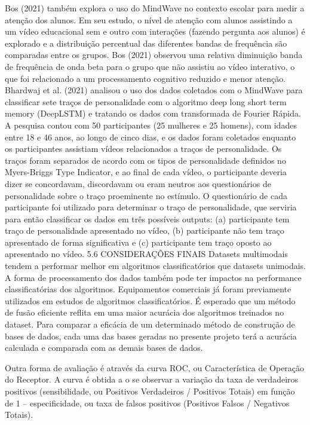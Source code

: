 Bos (2021) também explora o uso do MindWave no contexto escolar para medir a atenção dos alunos. Em seu estudo, o nível de atenção com alunos assistindo a um vídeo educacional sem e outro com interações (fazendo pergunta aos alunos) é explorado e a distribuição percentual das diferentes bandas de frequência são comparadas entre os grupos. Bos (2021) observou uma relativa diminuição banda de frequência de onda beta para o grupo que não assistiu ao vídeo interativo, o que foi relacionado a um processamento cognitivo reduzido e menor atenção.
Bhardwaj et al. (2021) analisou o uso dos dados coletados com o MindWave para classificar sete traços de personalidade com o algoritmo deep long short term memory (DeepLSTM) e tratando os dados com transformada de Fourier Rápida. A pesquisa contou com 50 participantes (25 mulheres e 25 homens), com idades entre 18 e 46 anos, ao longo de cinco dias, e os dados foram coletados enquanto os participantes assistiam vídeos relacionados a traços de personalidade. Os traços foram separados de acordo com os tipos de personalidade definidos no Myers-Briggs Type Indicator, e ao final de cada vídeo, o participante deveria dizer se concordavam, discordavam ou eram neutros aos questionários de personalidade sobre o traço proeminente no estímulo. O questionário de cada participante foi utilizado para determinar o traço de personalidade, que serviria para então classificar os dados em três possíveis outputs: (a) participante tem traço de personalidade apresentado no vídeo, (b) participante não tem traço apresentado de forma significativa e (c) participante tem traço oposto ao apresentado no vídeo. 
5.6 CONSIDERAÇÕES FINAIS
Datasets multimodais tendem a performar melhor em algoritmos classificatórios que datasets unimodais. 
A forma de processamento dos dados também pode ter impactos na performance classificatórias dos algoritmos. 
Equipamentos comerciais já foram previamente utilizados em estudos de algoritmos classificatórios. 
É esperado que um método de fusão eficiente reflita em uma maior acurácia dos algoritmos treinados no dataset. 
Para comparar a eficácia de um determinado método de construção de bases de dados, 
cada uma das bases geradas no presente projeto terá a acurácia calculada e comparada com as demais bases de dados.





Outra forma de avaliação é através da curva ROC, 
ou Característica de Operação do Receptor. A curva é obtida a
o se observar a variação da taxa de verdadeiros positivos (sensibilidade, ou Positivos Verdadeiros / Positivos Totais) em função de 1 – 
especificidade, ou taxa de falsos positivos (Positivos Falsos / Negativos Totais). 